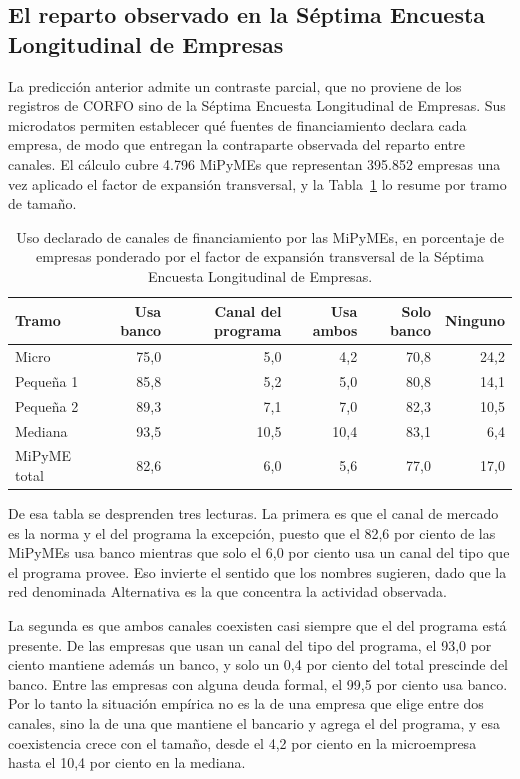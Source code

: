 \subsection{El reparto observado en la Séptima Encuesta Longitudinal de Empresas}
\label{c4:prediccion-ele7}

La predicción anterior admite un contraste parcial, que no proviene de los registros de CORFO sino de la Séptima Encuesta Longitudinal de Empresas. Sus microdatos permiten establecer qué fuentes de financiamiento declara cada empresa, de modo que entregan la contraparte observada del reparto entre canales. El cálculo cubre 4.796 MiPyMEs que representan 395.852 empresas una vez aplicado el factor de expansión transversal, y la Tabla~\ref{tab:ele7-canales} lo resume por tramo de tamaño.

\begin{table}[H]
    \centering
    \small
    \caption[Uso de canales de financiamiento por las MiPyMEs]{Uso declarado de
    canales de financiamiento por las MiPyMEs, en porcentaje de empresas
    ponderado por el factor de expansión transversal de la Séptima Encuesta
    Longitudinal de Empresas.}
    \label{tab:ele7-canales}
    \begin{tabular}{lrrrrr}
        \toprule
        Tramo & Usa banco & Canal del programa & Usa ambos & Solo banco & Ninguno \\
        \midrule
        Micro & 75,0 & 5,0 & 4,2 & 70,8 & 24,2 \\
        Pequeña 1 & 85,8 & 5,2 & 5,0 & 80,8 & 14,1 \\
        Pequeña 2 & 89,3 & 7,1 & 7,0 & 82,3 & 10,5 \\
        Mediana & 93,5 & 10,5 & 10,4 & 83,1 & 6,4 \\
        \midrule
        MiPyME total & 82,6 & 6,0 & 5,6 & 77,0 & 17,0 \\
        \bottomrule
    \end{tabular}
\end{table}

De esa tabla se desprenden tres lecturas. La primera es que el canal de mercado es la norma y el del programa la excepción, puesto que el 82,6 por ciento de las MiPyMEs usa banco mientras que solo el 6,0 por ciento usa un canal del tipo que el programa provee. Eso invierte el sentido que los nombres sugieren, dado que la red denominada Alternativa es la que concentra la actividad observada.

La segunda es que ambos canales coexisten casi siempre que el del programa está presente. De las empresas que usan un canal del tipo del programa, el 93,0 por ciento mantiene además un banco, y solo un 0,4 por ciento del total prescinde del banco. Entre las empresas con alguna deuda formal, el 99,5 por ciento usa banco. Por lo tanto la situación empírica no es la de una empresa que elige entre dos canales, sino la de una que mantiene el bancario y agrega el del programa, y esa coexistencia crece con el tamaño, desde el 4,2 por ciento en la microempresa hasta el 10,4 por ciento en la mediana.

